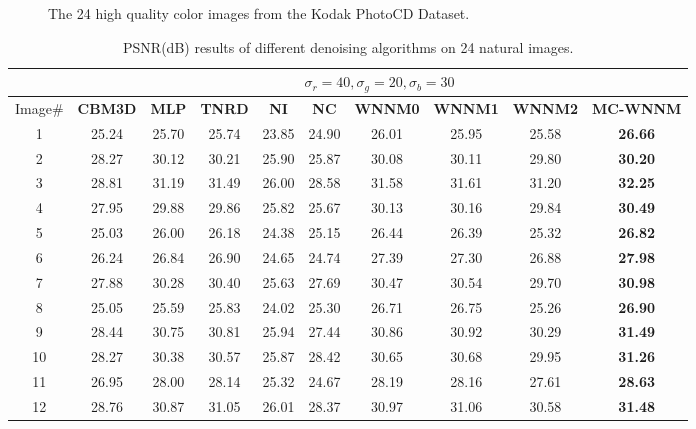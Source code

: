\documentclass[10pt,twocolumn,letterpaper,sort&compress]{article}
\begin{document}
\begin{figure}
{\begin{minipage}{0.075\textwidth}
\end{minipage}
}\vspace{-1mm}
\caption{The 24 high quality color images from the Kodak PhotoCD Dataset.}
\label{f2}
\vspace{-2mm}
\end{figure}


\begin{table}
\caption{PSNR(dB) results of different denoising algorithms on 24 natural images.}
\label{taba}
\begin{center}
\renewcommand\arraystretch{1.0}
\scriptsize
\begin{tabular}{|c||c|c|c|c|c|c|c|c|c|}
\hline
&\multicolumn{9}{c|}{ $\sigma_{r} = 40, \sigma_{g} = 20, \sigma_{b} = 30$}
\\
\hline
\hline
Image\#
&
\textbf{CBM3D}
&
\textbf{MLP}
&
\textbf{TNRD}
&
\textbf{NI}
&
\textbf{NC}
&
\textbf{WNNM0}
&
\textbf{WNNM1}
&
\textbf{WNNM2}
&
\textbf{MC-WNNM}
\\
\hline
1& 25.24 & 25.70 & 25.74 & 23.85 & 24.90 & 26.01 & 25.95 & 25.58 & \textbf{26.66}
\\
\hline
2& 28.27 & 30.12 & 30.21 & 25.90 & 25.87 & 30.08 & 30.11 & 29.80 & \textbf{30.20} 
\\
\hline
3 & 28.81 & 31.19 & 31.49 & 26.00 & 28.58 & 31.58 & 31.61 & 31.20 & \textbf{32.25}  
\\
\hline 
4 & 27.95 & 29.88 & 29.86 & 25.82 & 25.67 & 30.13 & 30.16 & 29.84 & \textbf{30.49} 
\\
\hline
5 & 25.03 & 26.00 & 26.18 & 24.38 & 25.15 & 26.44 & 26.39 & 25.32 & \textbf{26.82}
\\
\hline
6 & 26.24 & 26.84 & 26.90 & 24.65 & 24.74 & 27.39 & 27.30 & 26.88 & \textbf{27.98} 
\\
\hline
7 & 27.88 & 30.28 & 30.40 & 25.63 & 27.69 & 30.47 & 30.54 & 29.70 & \textbf{30.98} 
\\
\hline
8 & 25.05 & 25.59 & 25.83 & 24.02 & 25.30 & 26.71 & 26.75 & 25.26 & \textbf{26.90}
\\
\hline
9 & 28.44 & 30.75 & 30.81 & 25.94 & 27.44 & 30.86 & 30.92 & 30.29 & \textbf{31.49}
\\
\hline
10 & 28.27 & 30.38 & 30.57 & 25.87 & 28.42 & 30.65 & 30.68 & 29.95 & \textbf{31.26}
\\
\hline
11 & 26.95 & 28.00 & 28.14 & 25.32 & 24.67 & 28.19 & 28.16 & 27.61 & \textbf{28.63}
\\
\hline
12 & 28.76 & 30.87 & 31.05 & 26.01 & 28.37 & 30.97 & 31.06 & 30.58 & \textbf{31.48}
\\

\end{tabular}
\end{center}
\end{table}
\end{document}
